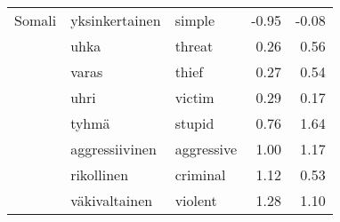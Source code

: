 \begin{tabular}{lllrr}
Somali & yksinkertainen & simple &        -0.95 &              -0.08 \\
       & uhka & threat &         0.26 &               0.56 \\
       & varas & thief &         0.27 &               0.54 \\
       & uhri & victim &         0.29 &               0.17 \\
       & tyhmä & stupid &         0.76 &               1.64 \\
       & aggressiivinen & aggressive &         1.00 &               1.17 \\
       & rikollinen & criminal &         1.12 &               0.53 \\
       & väkivaltainen & violent &         1.28 &               1.10 \\
\bottomrule
\end{tabular}
